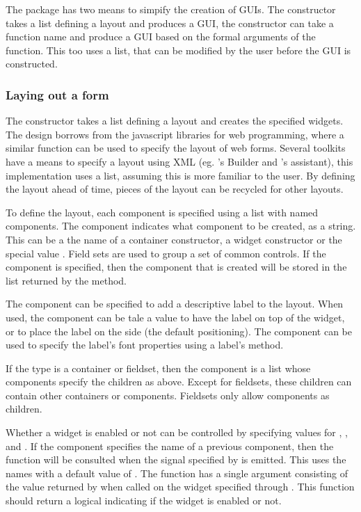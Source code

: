 The  package has two means to simpify the creation of
GUIs. The  constructor takes a list defining a
layout and produces a GUI, the  constructor can
take a function name and produce a GUI based on the formal arguments
of the function. This too uses a list, that can be modified by the
user before the GUI is constructed. 

\subsubsection{Laying out a form}
\label{sec:gWidgets-laying-out-form}

The  constructor takes a list defining a
layout and creates the specified widgets. The design borrows from the
 javascript libraries for web programming, where a similar
function can be used to specify the layout of web forms. Several
toolkits have a means to specify a layout using XML (eg. \GTK's
Builder and \Qt's assistant), this implementation uses a list,
assuming this is more familiar to the \R\/ user. By defining the
layout ahead of time, pieces of the layout can be recycled for other
layouts.


To define the layout, each component is specified using a list with
named components. The component  indicates what component
to be created, as a string. This can be a the name of a container
constructor, a widget constructor or the special value
. Field sets are used to group a set of common
controls. If the component  is specified, then the
component that is created will be stored in the list returned by the
\code{[} method.

The  component can be specified to
add a descriptive label to the layout. When used, the component
 can be tale a value  to have the label
on top of the widget, or  to place the label on the side
(the default positioning). The  component can be used
to specify the label's font properties using a label's  method.

If the type is a container or fieldset, then the 
component is a list whose components specify the children as
above. Except for fieldsets, these children can contain other
containers or components. Fieldsets only allow components as children.

Whether a widget is enabled or not can be controlled by specifying
values for , , and
. If the component  specifies
the name of a previous component, then the function 
will be consulted when the signal specified by 
is emitted. This uses the  names with a default
value of . The  function has
a single argument consisting of the value returned by 
when called on the widget specified through . This
function should return a logical indicating if the widget is enabled
or not.

